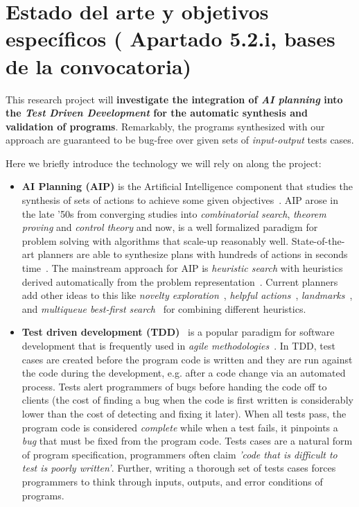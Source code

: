 \documentclass[10pt,a4paper]{paper}
\begin{document}
\section{Estado del arte y objetivos específicos ( Apartado 5.2.i, bases de la convocatoria)}

This research project will {\bf investigate the integration of {\em AI planning} into the {\em Test Driven Development} for the automatic synthesis and validation of programs}. Remarkably, the programs synthesized with our approach are guaranteed to be bug-free over given sets of {\em input-output} tests cases.

Here we briefly introduce the technology we will rely on along the project:
\begin{itemize}
\item {\bf AI Planning (AIP)} is the Artificial Intelligence component that studies the synthesis of sets of actions to achieve some given objectives~\cite{ghallab2004automated}. AIP arose in the late ’50s from converging studies into {\em combinatorial search}, {\em theorem proving} and {\em control theory} and now, is a well formalized paradigm for problem solving with algorithms that scale-up reasonably well. State-of-the-art planners are able to synthesize plans with hundreds of actions in seconds time~\cite{geffner2013concise}.  The mainstream approach for AIP is {\em heuristic search} with heuristics derived automatically from the problem representation~\cite{mcdermott1996heuristic,bonet2001planning}.  Current planners add other ideas to this like {\it novelty exploration}~\cite{geffner:psimulators:IJCAI17}, {\it helpful actions}~\cite{hoffmann2001ff}, {\it landmarks}~\cite{helmert2006fast}, and {\it multiqueue best-first search}~\cite{richter2010lama} for combining different heuristics.
  
\item {\bf Test driven development (TDD)}~\cite{beck:TDD:2003} is a popular paradigm for software development that is frequently used in {\it agile methodologies}~\cite{cohen2003agile}. In TDD, test cases are created before the program code is written and they are run against the code during the development, e.g. after a code change via an automated process. Tests alert programmers of bugs before handing the code off to clients (the cost of finding a bug when the code is first written is considerably lower than the cost of detecting and fixing it later). When all tests pass, the program code is considered {\em complete} while when a test fails, it pinpoints a {\em bug} that must be fixed from the program code. Tests cases are a natural form of program specification, programmers often claim {\em 'code that is difficult to test is poorly written'}. Further, writing a thorough set of tests cases forces programmers to think through inputs, outputs, and error conditions of programs. 
\end{itemize}
\end{document}
